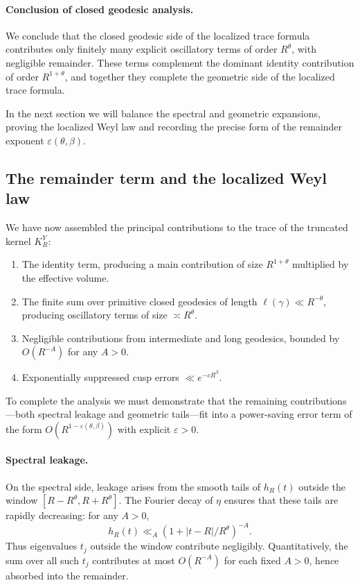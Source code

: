 \paragraph{Conclusion of closed geodesic analysis.}
We conclude that the closed geodesic side of the localized trace formula contributes only finitely many explicit 
oscillatory terms of order $R^\theta$, with negligible remainder. These terms complement the dominant identity 
contribution of order $R^{1+\theta}$, and together they complete the geometric side of the localized trace formula. 

In the next section we will balance the spectral and geometric expansions, proving the localized Weyl law and 
recording the precise form of the remainder exponent $\varepsilon(\theta,\beta)$. 

\subsection{The remainder term and the localized Weyl law}\label{subsec:geom-remainder}

We have now assembled the principal contributions to the trace of the truncated kernel $K_R^Y$:
\begin{enumerate}
\item The identity term, producing a main contribution of size $R^{1+\theta}$ multiplied by the effective volume.
\item The finite sum over primitive closed geodesics of length $\ell(\gamma)\ll R^{-\theta}$, producing oscillatory terms of size $\asymp R^\theta$.
\item Negligible contributions from intermediate and long geodesics, bounded by $O(R^{-A})$ for any $A>0$.
\item Exponentially suppressed cusp errors $\ll e^{-cR^\beta}$.
\end{enumerate}
To complete the analysis we must demonstrate that the remaining contributions—both spectral leakage and geometric tails—fit into a power-saving error term of the form $O(R^{1-\varepsilon(\theta,\beta)})$ with explicit $\varepsilon>0$.

\paragraph{Spectral leakage.}
On the spectral side, leakage arises from the smooth tails of $h_R(t)$ outside the window $[R-R^\theta,R+R^\theta]$. The Fourier decay of $\eta$ ensures that these tails are rapidly decreasing: for any $A>0$,
\[
h_R(t) \ll_A (1+|t-R|/R^\theta)^{-A}.
\]
Thus eigenvalues $t_j$ outside the window contribute negligibly. Quantitatively, the sum over all such $t_j$ contributes at most $O(R^{-A})$ for each fixed $A>0$, hence absorbed into the remainder.


